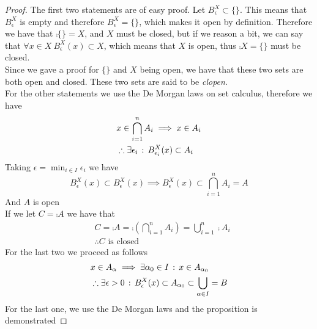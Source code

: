 \documentclass[../complete.tex]{subfiles}
\begin{document}
\begin{proof}
	The first two statements are of easy proof. Let $B^X_\epsilon\subset\{\}$. This means that $B^X_\epsilon$ is empty and therefore $B^X_\epsilon=\{\}$, which makes it open by definition. Therefore we have that $\comp{\{\}}=X$, and $X$ must be closed, but if we reason a bit, we can say that $\forall x\in X\ B_\epsilon^X(x)\subset X$, which means that $X$ is open, thus $\comp{X}=\{\}$ must be closed.\\
	Since we gave a proof for $\{\}$ and $X$ being open, we have that these two sets are both open and closed. These two sets are said to be \textit{clopen}.\\
	For the other statements we use the De Morgan laws on set calculus, therefore we have
	\begin{equation*}
		\begin{aligned}
			&x\in\bigcap_{i=1}^nA_i\implies{} x\in A_i\\
			&\therefore\exists\epsilon_i\, :\,  B^X_{\epsilon_i}(x)\subset A_i\\
		\end{aligned}
	\end{equation*}
	Taking $\epsilon=\min_{i\in I}\epsilon_i$ we have
	\begin{equation*}
		B_\epsilon^X(x)\subset B_\epsilon^X(x)\implies{} B_\epsilon^X(x)\subset\bigcap_{i=1}^nA_i=A
	\end{equation*}
	And $A$ is open\\
	If we let $C=\comp{A}$ we have that\\
	\begin{equation*}
		\begin{aligned}
			&C=\comp{A}=\comp{\left( \bigcap_{i=1}^nA_i \right)}=\bigcup_{i=1}^n\comp{A}_i\\
			&\therefore{C}\text{ is closed}
		\end{aligned}
	\end{equation*}
	For the last two we proceed as follows
	\begin{equation*}
		\begin{aligned}
			&x\in A_\alpha\implies{}\exists\alpha_0\in I\, :\,  x\in A_{\alpha_0}\\
			&\therefore\exists\epsilon>0\, :\,  B_{\epsilon}^X(x)\subset A_{\alpha_0}\subset\bigcup_{\alpha\in I}=B
		\end{aligned}
	\end{equation*}
	For the last one, we use the De Morgan laws and the proposition is demonstrated
\end{proof}
\end{document}
